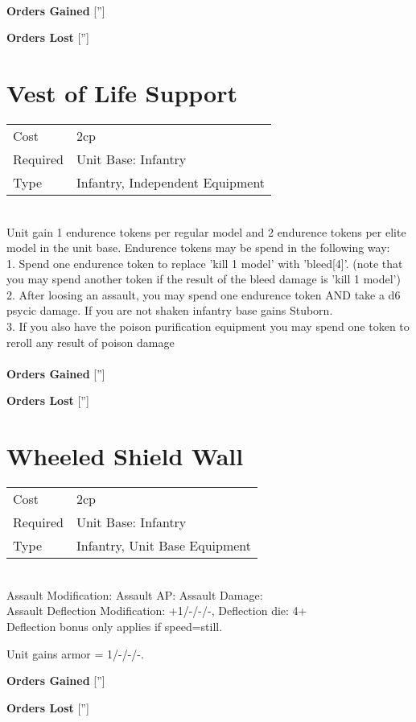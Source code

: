 \ \\

{\bf Orders Gained}
['']

{\bf Orders Lost}
['']
\section{ Vest of Life Support }

\begin{tabular}{ll}
    Cost & 2cp \\
    Required & Unit Base: Infantry\\
    Type & Infantry, Independent Equipment\\
\end{tabular}
\ \\
Unit gain 1 endurence tokens per regular model  and 2 endurence tokens per elite model in the unit base. Endurence tokens may be spend in the following way: \\ 1. Spend one endurence token to replace 'kill 1 model' with 'bleed[4]'. (note that you may spend another token if the result of the bleed damage is 'kill 1 model') \\ 2. After loosing an assault, you may spend one endurence token AND take a d6 psycic damage. If you are not shaken infantry base gains Stuborn. \\ 3. If you also have the poison purification equipment you may spend one token to reroll any result of poison damage \\

\ \\

{\bf Orders Gained}
['']

{\bf Orders Lost}
['']
\section{ Wheeled Shield Wall }

\begin{tabular}{ll}
    Cost & 2cp \\
    Required & Unit Base: Infantry\\
    Type & Infantry, Unit Base Equipment\\
\end{tabular}
\ \\
Assault Modification:  Assault AP:  Assault Damage: \\
Assault Deflection Modification: +1/-/-/-, Deflection die: 4+ \\
Deflection bonus only applies if speed=still.

Unit gains armor = 1/-/-/-. 

{\bf Orders Gained}
['']

{\bf Orders Lost}
['']

